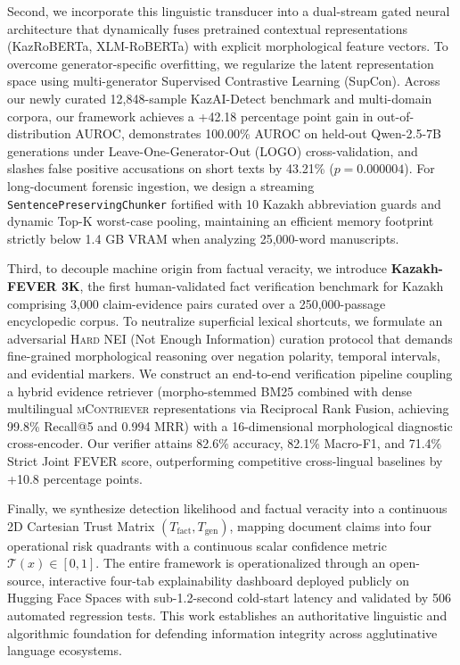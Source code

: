 Second, we incorporate this linguistic transducer into a dual-stream gated neural architecture that dynamically fuses pretrained contextual representations (KazRoBERTa, XLM-RoBERTa) with explicit morphological feature vectors. To overcome generator-specific overfitting, we regularize the latent representation space using multi-generator Supervised Contrastive Learning (SupCon). Across our newly curated 12,848-sample KazAI-Detect benchmark and multi-domain corpora, our framework achieves a +42.18 percentage point gain in out-of-distribution AUROC, demonstrates 100.00\% AUROC on held-out Qwen-2.5-7B generations under Leave-One-Generator-Out (LOGO) cross-validation, and slashes false positive accusations on short texts by 43.21\% ($p = 0.000004$). For long-document forensic ingestion, we design a streaming \texttt{SentencePreservingChunker} fortified with 10 Kazakh abbreviation guards and dynamic Top-K worst-case pooling, maintaining an efficient memory footprint strictly below 1.4 GB VRAM when analyzing 25,000-word manuscripts.

Third, to decouple machine origin from factual veracity, we introduce \textbf{Kazakh-FEVER 3K}, the first human-validated fact verification benchmark for Kazakh comprising 3,000 claim-evidence pairs curated over a 250,000-passage encyclopedic corpus. To neutralize superficial lexical shortcuts, we formulate an adversarial \textsc{Hard NEI} (Not Enough Information) curation protocol that demands fine-grained morphological reasoning over negation polarity, temporal intervals, and evidential markers. We construct an end-to-end verification pipeline coupling a hybrid evidence retriever (morpho-stemmed BM25 combined with dense multilingual \textsc{mContriever} representations via Reciprocal Rank Fusion, achieving 99.8\% Recall@5 and 0.994 MRR) with a 16-dimensional morphological diagnostic cross-encoder. Our verifier attains 82.6\% accuracy, 82.1\% Macro-F1, and 71.4\% Strict Joint FEVER score, outperforming competitive cross-lingual baselines by +10.8 percentage points.

Finally, we synthesize detection likelihood and factual veracity into a continuous 2D Cartesian Trust Matrix $(T_{\text{fact}}, T_{\text{gen}})$, mapping document claims into four operational risk quadrants with a continuous scalar confidence metric $\mathcal{T}(x) \in [0, 1]$. The entire framework is operationalized through an open-source, interactive four-tab explainability dashboard deployed publicly on Hugging Face Spaces with sub-1.2-second cold-start latency and validated by 506 automated regression tests. This work establishes an authoritative linguistic and algorithmic foundation for defending information integrity across agglutinative language ecosystems.

